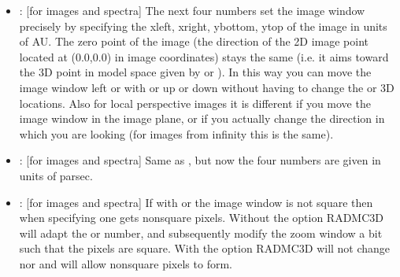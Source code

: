 \documentclass[letterpaper,10pt,english]{sphinxmanual}
\begin{document}
\begin{itemize}
\item {} 
: {[}for images and spectra{]} The next four numbers set the image
window precisely by specifying the xleft, xright, ybottom, ytop of the image
in units of AU. The zero point of the image (the direction of the 2\sphinxhyphen{}D image
point located at (0.0,0.0) in image coordinates) stays the same (i.e. it aims
toward the 3\sphinxhyphen{}D point in model space given by  or ). In
this way you can move the image window left or with or up or down without
having to change the  or  3\sphinxhyphen{}D locations. Also for local
perspective images it is different if you move the image window in the image
plane, or if you actually change the direction in which you are looking (for
images from infinity this is the same). 

\item {} 
: {[}for images and spectra{]} Same as , but
now the four numbers are given in units of parsec.

\item {} 
: {[}for images and spectra{]} If with  or  the
image window is not square then when specifying  one gets non\sphinxhyphen{}square
pixels. Without the  option RADMC\sphinxhyphen{}3D will adapt the  or
 number, and subsequently modify the zoom window a bit such that the
pixels are square. With the  option RADMC\sphinxhyphen{}3D will not change
 nor  and will allow non\sphinxhyphen{}square pixels to form.


\end{itemize}
\end{document}
